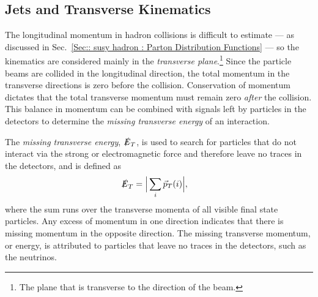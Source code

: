 \documentclass[twoside,english]{uiofysmaster}
\begin{document}
{\subsection{Jets and Transverse Kinematics}\label{Sec:: susy hadron : Jets and transverse kinematics}

The longitudinal momentum in hadron collisions is difficult to estimate --- as discussed in Sec.~\ref{Sec:: susy hadron : Parton Distribution Functions} --- so the kinematics are considered mainly in the \textit{transverse plane}.\footnote{The plane that is transverse to the direction of the beam.} Since the particle beams are collided in the longitudinal direction, the total momentum in the transverse directions is zero before the collision. Conservation of momentum dictates that the total transverse momentum must remain zero \textit{after} the collision. This balance in momentum can be combined with signals left by particles in the detectors to determine the \textit{missing transverse energy} of an interaction.

The \textit{missing transverse energy}, $\slashed{E}_T$, is used to search for particles that do not interact via the strong or electromagnetic force and therefore leave no traces in the detectors, and is defined as
\begin{align}\label{Eq:: susy hadron : Missing energy}
\slashed{E}_T &= \Big| \sum_i \vec{p}_T (i)\Big| ,
\end{align} 
where the sum runs over the transverse momenta of all visible final state particles.  Any excess of momentum in one direction indicates that there is missing momentum in the opposite direction. The missing transverse momentum, or energy, is attributed to particles that leave no traces in the detectors, such as the neutrinos.  


}
\end{document}
